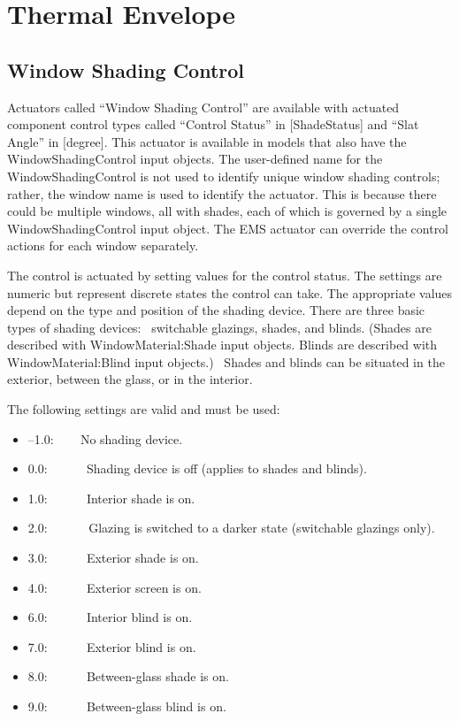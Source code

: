 \section{Thermal Envelope}\label{thermal-envelope}

\subsection{Window Shading Control}\label{window-shading-control}

Actuators called ``Window Shading Control'' are available with actuated component control types called ``Control Status'' in [ShadeStatus] and ``Slat Angle'' in [degree]. This actuator is available in models that also have the WindowShadingControl input objects. The user-defined name for the WindowShadingControl is not used to identify unique window shading controls; rather, the window name is used to identify the actuator. This is because there could be multiple windows, all with shades, each of which is governed by a single WindowShadingControl input object. The EMS actuator can override the control actions for each window separately.

The control is actuated by setting values for the control status. The settings are numeric but represent discrete states the control can take. The appropriate values depend on the type and position of the shading device. There are three basic types of shading devices:~ switchable glazings, shades, and blinds. (Shades are described with WindowMaterial:Shade input objects. Blinds are described with WindowMaterial:Blind input objects.)~ Shades and blinds can be situated in the exterior, between the glass, or in the interior.

The following settings are valid and must be used:

\begin{itemize}
\item
  --1.0: ~~~ No shading device.
\item
  0.0: ~~~~~ Shading device is off (applies to shades and blinds).
\item
  1.0: ~~~~~ Interior shade is on.
\item
  2.0:~~~~~~ Glazing is switched to a darker state (switchable glazings only).
\item
  3.0: ~~~~~ Exterior shade is on.
\item
  4.0: ~~~~~ Exterior screen is on.
\item
  6.0: ~~~~~ Interior blind is on.
\item
  7.0: ~~~~~ Exterior blind is on.
\item
  8.0: ~~~~~ Between-glass shade is on.
\item
  9.0: ~~~~~ Between-glass blind is on.
\end{itemize}


